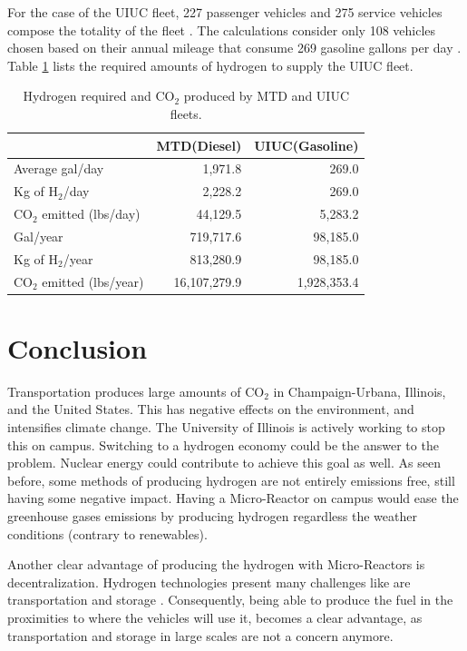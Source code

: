 \documentclass{anstrans}
\begin{document}
For the case of the UIUC fleet, 227 passenger vehicles and 275 service vehicles compose the totality of the fleet \cite{noauthor_increase_2020}. The calculations consider only 108 vehicles chosen based on their annual mileage that consume 269 gasoline gallons per day \cite{holcomb_fueling_2015}. Table \ref{tab:h2req} lists the required amounts of hydrogen to supply the UIUC fleet.

\begin{table}[]
	\centering
    \caption{Hydrogen required and CO$_2$ produced by MTD and UIUC fleets.}
    \label{tab:h2req}
\begin{tabular}{l|rr}
\hline
                          & MTD(Diesel)     & UIUC(Gasoline)  \\ \hline
Average gal/day           & 1,971.8          & 269.0            \\
Kg of H$_2$/day           & 2,228.2          & 269.0            \\
CO$_2$ emitted (lbs/day)  & 44,129.5         & 5,283.2          \\
Gal/year                  & 719,717.6        & 98,185.0         \\
Kg of H$_2$/year          & 813,280.9        & 98,185.0         \\
CO$_2$ emitted (lbs/year) & 16,107,279.9     & 1,928,353.4      \\ \hline
\end{tabular}
\end{table}

\section{Conclusion}

Transportation produces large amounts of CO$_2$ in Champaign-Urbana, Illinois, and the United States. This has negative effects on the environment, and intensifies climate change. The University of Illinois is actively working to stop this on campus. Switching to a hydrogen economy could be the answer to the problem. Nuclear energy could contribute to achieve this goal as well. As seen before, some methods of producing hydrogen are not entirely emissions free, still having some negative impact. Having a Micro-Reactor on campus would ease the greenhouse gases emissions by producing hydrogen regardless the weather conditions (contrary to renewables).

Another clear advantage of producing the hydrogen with Micro-Reactors is decentralization. Hydrogen technologies present many challenges like are transportation and storage \cite{office_of_energy_efficiency_and_renewable_energy_hydrogen_2020}. Consequently, being able to produce the fuel in the proximities to where the vehicles will use it, becomes a clear advantage, as transportation and storage in large scales are not a concern anymore.



\end{document}
